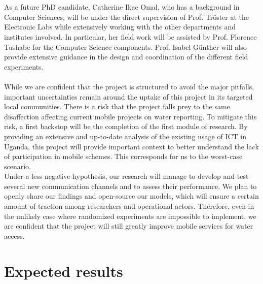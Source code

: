 \documentclass[11pt]{article}
\begin{document}
\\\\
As a future PhD candidate, Catherine Ikae Omal, who has a background in Computer Sciences, will be under the direct supervision of Prof. Tröster at the Electronic Labs while extensively working with the other departments and institutes involved. In particular, her field work will be assisted by Prof. Florence Tushabe for the Computer Science components. Prof. Isabel Günther will also provide extensive guidance in the design and coordination of the different field experiments.
\\\\
While we are confident that the project is structured to avoid the major pitfalls, important uncertainties remain around the uptake of this project in its targeted local communities. There is a risk that the project falls prey to the same disaffection affecting current mobile projects on water reporting. To mitigate this risk, a first backstop will be the completion of the first module of research. By providing an extensive and up-to-date analysis of the existing usage of ICT in Uganda, this project will provide important context to better understand the lack of participation in mobile schemes. This corresponds for us to the worst-case scenario.
\\
Under a less negative hypothesis, our research will manage to develop and test several new communication channels and to assess their performance. We plan to openly share our findings and open-source our models, which will ensure a certain amount of traction among researchers and operational actors. Therefore, even in the unlikely case where randomized experiments are impossible to implement, we are confident that the project will still greatly improve mobile services for water access.
\section{Expected results}\label{expected}
\end{document}
